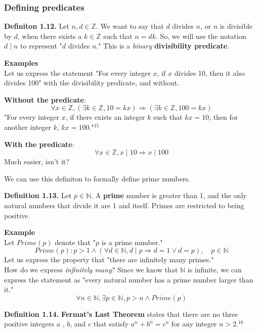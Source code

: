 \documentclass{article}
\begin{document}
\subsubsection*{Defining predicates}
\textbf{Definiton 1.12.} Let $n, d \in \mathbb{Z}$. We want to say that $d$ 
divides $n$, or $n$ is divisible by $d$, when there exists a $k \in \mathbb{Z}$ 
such that $n = dk$. So, we will use the notation $d \mid n$ to represent 
"$d$ divides $n$." This is a \textit{binary} \textbf{divisibility predicate}. 

\textbf{Examples} \\
Let us express the statement "For every integer $x$, if $x$ divides 10, then 
it also divides 100" with the divisibility predicate, and without.

\textbf{Without the predicate}:
$$\forall x \in \mathbb{Z}, (\exists k \in \mathbb{Z}, 10 = kx) \Rightarrow 
(\exists k \in \mathbb{Z}, 100 = kx)$$
"For every integer $x$, if there exists an integer $k$ such that $kx = 10$, then 
for another integer $k$, $kx = 100$."$^{15}$

\textbf{With the predicate}:
$$\forall x \in \mathbb{Z}, x \mid 10 \Rightarrow x \mid 100$$ 
Much easier, isn't it? 

We can use this definiton to formally define prime numbers.

\textbf{Definition 1.13.} Let $p \in \mathbb{N}$. A \textbf{prime} number is greater 
than 1, and the only natural numbers that divide it are 1 and itself. Primes are
restricted to being positive. 

\textbf{Example} \\
Let $Prime(p)$ denote that "$p$ is a prime number."
$$Prime(p) : p > 1 \land (\forall d \in \mathbb{N}, d \mid p \Rightarrow 
d = 1 \lor d = p), \quad p \in \mathbb{N}$$
Let us express the property that "there are infinitely many primes." \\
How do we express \textit{infinitely many}? Since we know that $ \mathbb{N}$ is
infinite, we can express the statement as "every natural number has a prime 
number larger than it."
$$\forall n \in \mathbb{N}, \exists p \in \mathbb{N}, p > n \land Prime(p)$$

\textbf{Definition 1.14.} \textbf{Fermat's Last Theorem} states that there are 
no three positive integers $a$ , $b$, and $c$ that satisfy $a^n + b^n = c^n$ for 
any integer $n > 2$.$^{16}$
\end{document}
